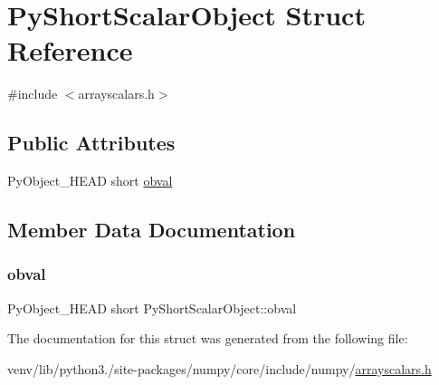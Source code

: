 \hypertarget{structPyShortScalarObject}{}\section{Py\+Short\+Scalar\+Object Struct Reference}
\label{structPyShortScalarObject}


{\ttfamily \#include $<$arrayscalars.\+h$>$}

\subsection*{Public Attributes}
\begin{DoxyCompactItemize}
\item 
Py\+Object\+\_\+\+H\+E\+AD short \hyperlink{structPyShortScalarObject_a04ed52238be1cd69f5805374267b454e}{obval}
\end{DoxyCompactItemize}


\subsection{Member Data Documentation}
\mbox{\label{structPyShortScalarObject_a04ed52238be1cd69f5805374267b454e}} 
\subsubsection{\texorpdfstring{obval}{obval}}
{\footnotesize\ttfamily Py\+Object\+\_\+\+H\+E\+AD short Py\+Short\+Scalar\+Object\+::obval}



The documentation for this struct was generated from the following file\+:\begin{DoxyCompactItemize}
\item 
venv/lib/python3./site-\/packages/numpy/core/include/numpy/\hyperlink{arrayscalars_8h}{arrayscalars.\+h}\end{DoxyCompactItemize}
